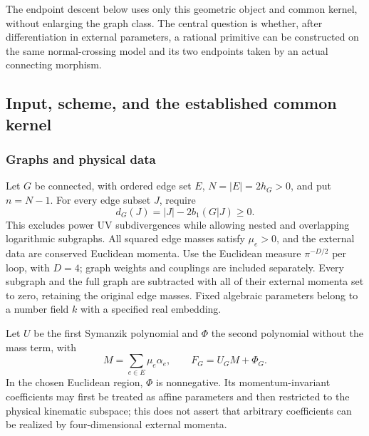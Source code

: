 \documentclass[11pt,a4paper,oneside]{article}
\theoremstyle{plain}
\theoremstyle{definition}
\theoremstyle{remark}
\newcommand{\Q}{\mathbb Q}
\newcommand{\im}{\operatorname{im}}
\newcommand{\Res}{\operatorname{Res}}
\newcommand{\dR}{\mathrm{dR}}
\numberwithin{equation}{section}
\begin{document}
The endpoint descent below uses only this geometric object and common kernel, without enlarging the graph class. The central question is whether, after differentiation in external parameters, a rational primitive can be constructed on the same normal-crossing model and its two endpoints taken by an actual connecting morphism.



\begingroup
\providecommand{\Q}{\mathbb Q}
\providecommand{\dR}{\mathrm{dR}}
\providecommand{\Res}{\operatorname{Res}}
\providecommand{\im}{\operatorname{im}}
\providecommand{\rk}{\operatorname{rk}}
\providecommand{\cR}{\mathcal R}
\providecommand{\cH}{\mathcal H}
\subsection{Input, scheme, and the established common kernel}
\subsubsection{Graphs and physical data}
Let $G$ be connected, with ordered edge set $E$, $N=|E|=2h_G>0$, and put $n=N-1$.
For every edge subset $J$, require
\begin{equation}\label{descent:eq:power}
 d_G(J)=|J|-2b_1(G|J)\geq0.
\end{equation}
This excludes power UV subdivergences while allowing nested and overlapping logarithmic subgraphs.
All squared edge masses satisfy $\mu_e>0$, and the external data are conserved Euclidean momenta.
Use the Euclidean measure $\pi^{-D/2}$ per loop, with $D=4$; graph weights and couplings are included separately.
Every subgraph and the full graph are subtracted with all of their external momenta set to zero, retaining the original edge masses.
Fixed algebraic parameters belong to a number field $k$ with a specified real embedding.

Let $U$ be the first Symanzik polynomial and $\Phi$ the second polynomial without the mass term, with
\begin{equation}\label{descent:eq:mass}
 M=\sum_{e\in E}\mu_e\alpha_e,\qquad F_G=U_GM+\Phi_G.
\end{equation}
In the chosen Euclidean region, $\Phi$ is nonnegative.
Its momentum-invariant coefficients may first be treated as affine parameters and then restricted to the physical kinematic subspace; this does not assert that arbitrary coefficients can be realized by four-dimensional external momenta.
\end{document}
